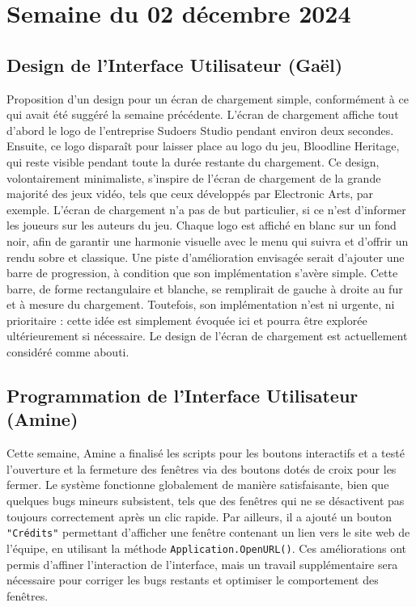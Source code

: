 \documentclass{report}
\begin{document}
\newpage
\section{Semaine du 02 décembre 2024}
\subsection*{Design de l'Interface Utilisateur (Gaël)}
Proposition d'un design pour un écran de chargement simple, conformément à ce qui avait été suggéré la semaine précédente. L'écran de chargement affiche tout d'abord le logo de l'entreprise Sudoers Studio pendant environ deux secondes. Ensuite, ce logo disparaît pour laisser place au logo du jeu, Bloodline Heritage, qui reste visible pendant toute la durée restante du chargement. Ce design, volontairement minimaliste, s'inspire de l'écran de chargement de la grande majorité des jeux vidéo, tels que ceux développés par Electronic Arts, par exemple. L'écran de chargement n'a pas de but particulier, si ce n'est d'informer les joueurs sur les auteurs du jeu. Chaque logo est affiché en blanc sur un fond noir, afin de garantir une harmonie visuelle avec le menu qui suivra et d'offrir un rendu sobre et classique. Une piste d'amélioration envisagée serait d'ajouter une barre de progression, à condition que son implémentation s'avère simple. Cette barre, de forme rectangulaire et blanche, se remplirait de gauche à droite au fur et à mesure du chargement. Toutefois, son implémentation n'est ni urgente, ni prioritaire : cette idée est simplement évoquée ici et pourra être explorée ultérieurement si nécessaire. Le design de l'écran de chargement est actuellement considéré comme abouti.

\subsection*{Programmation de l'Interface Utilisateur (Amine)}
Cette semaine, Amine a finalisé les scripts pour les boutons interactifs et a testé l’ouverture et la fermeture des fenêtres via des boutons dotés de croix pour les fermer. Le système fonctionne globalement de manière satisfaisante, bien que quelques bugs mineurs subsistent, tels que des fenêtres qui ne se désactivent pas toujours correctement après un clic rapide. Par ailleurs, il a ajouté un bouton \texttt{"Crédits"} permettant d’afficher une fenêtre contenant un lien vers le site web de l’équipe, en utilisant la méthode \texttt{Application.OpenURL()}. Ces améliorations ont permis d’affiner l’interaction de l’interface, mais un travail supplémentaire sera nécessaire pour corriger les bugs restants et optimiser le comportement des fenêtres.
\end{document}
